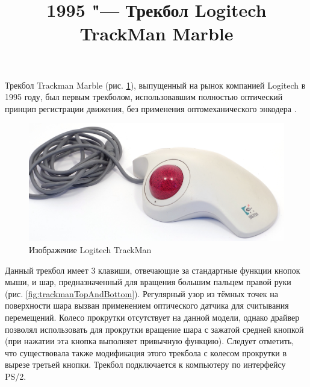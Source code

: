 \documentclass[11pt, a4paper]{article}
\begin{document}
\title{1995 "--- Трекбол Logitech TrackMan Marble}
\date{}
\maketitle
{}
Трекбол Trackman Marble (рис. \ref{fig:trackman}), выпущенный на рынок компанией Logitech в 1995 году, был первым трекболом, использовавшим полностью оптический принцип регистрации движения, без применения оптомеханического энкодера \cite{logitech25}.

\begin{figure}[h]
    \centering
    \includegraphics[scale=0.4]{1995_logitech_trackman/pic_60.jpg}
    \caption{Изображение Logitech TrackMan}
    \label{fig:trackman}
\end{figure}

Данный трекбол имеет 3 клавиши, отвечающие за стандартные функции кнопок мыши, и шар, предназначенный для вращения большим пальцем правой руки (рис. \ref{fig:trackmanTopAndBottom}). Регулярный узор из тёмных точек на поверхности шара вызван применением оптического датчика для считывания перемещений. Колесо прокрутки отсутствует на данной модели, однако драйвер позволял использовать для прокрутки вращение шара с зажатой средней кнопкой (при нажатии эта кнопка выполняет привычную функцию). Следует отметить, что существовала также модификация этого трекбола с колесом прокрутки в вырезе третьей кнопки. Трекбол подключается к компьютеру по интерфейсу PS/2.
\end{document}
